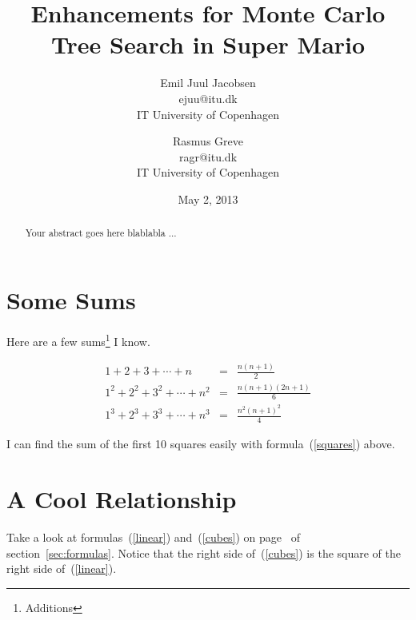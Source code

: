 \documentclass[10pt,a4paper]{article}
\title{Enhancements for Monte Carlo Tree Search in Super Mario}
\date{May 2, 2013}
\author{Emil Juul Jacobsen\\ejuu@itu.dk\\IT University of Copenhagen
        \and Rasmus Greve\\ragr@itu.dk\\IT University of Copenhagen}
\begin{document}
\maketitle
\begin{abstract}
Your abstract goes here blablabla ...
\end{abstract}

\pagebreak

\section{Some Sums}

Here are a few sums\footnote{Additions}  I know.\label{sec:formulas}

\begin{eqnarray}
1+2+3+\cdots+n&=&\frac{n(n+1)}{2}\label{linear}\\
1^2+2^2+3^2+\cdots+n^2&=& \frac{n(n+1)(2n+1)}{6}\label{squares}\\
1^3+2^3+3^3+\cdots+n^3&=& \frac{n^2(n+1)^2}{4}\label{cubes}
\end{eqnarray}

I can find the sum of the first 10 squares easily with formula~(\ref{squares}) above.

\pagebreak

\section{A Cool Relationship}

Take a look at formulas~(\ref{linear}) and~(\ref{cubes}) on
page~\pageref{linear} of section~\ref{sec:formulas}. Notice that the
right side of~(\ref{cubes}) is the square of the right side
of~(\ref{linear}).
\end{document}
